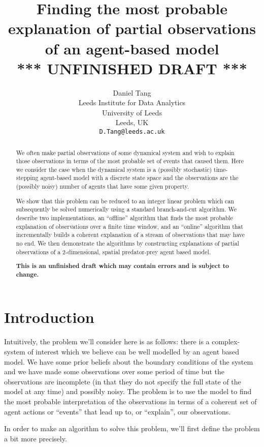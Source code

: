 \documentclass{article}
\title{Finding the most probable explanation of partial observations of an agent-based model\\
*** UNFINISHED DRAFT ***}
\author{
  Daniel Tang\\
  Leeds Institute for Data Analytics\\
  University of Leeds\\
  Leeds, UK\\
  \texttt{D.Tang@leeds.ac.uk} \\
}
\begin{document}
\maketitle

\begin{abstract}
We often make partial observations of some dynamical system and wish to explain those observations in terms of the most probable set of events that caused them. Here we consider the case when the dynamical system is a (possibly stochastic) time-stepping agent-based model with a discrete state space and the observations are the (possibly noisy) number of agents that have some given property.

We show that this problem can be reduced to an integer linear problem which can subsequently be solved numerically using a standard branch-and-cut algorithm. We describe two implementations, an ``offline'' algorithm that finds the most probable explanation of observations over a finite time window, and an ``online'' algorithm that incrementally builds a coherent explanation of a stream of observations that may have no end. We then demonstrate the algorithms by constructing explanations of partial observations of a 2-dimensional, spatial predator-prey agent based model.

\textbf{This is an unfinished draft which may contain errors and is subject to change.}
\end{abstract}


\section{Introduction}

Intuitively, the problem we'll consider here is as follows: there is a complex-system of interest which we believe can be well modelled by an agent based model. We have some prior beliefs about the boundary conditions of the system and we have made some observations over some period of time but the observations are incomplete (in that they do not specify the full state of the model at any time) and possibly noisy. The problem is to use the model to find the most probable interpretation of the observations in terms of a coherent set of agent actions or ``events'' that lead up to, or ``explain'',  our observations.

In order to make an algorithm to solve this problem, we'll first define the problem a bit more precisely.
\end{document}
